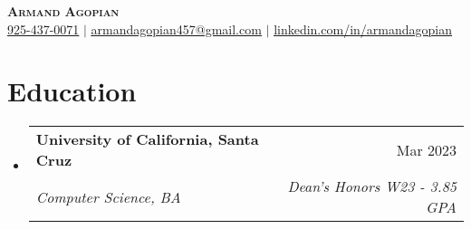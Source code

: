 \documentclass[letterpaper,11pt]{article}
\makeatletter
\newcommand{\resumeSubheading}[4]{
  \vspace{-2pt}\item
    \begin{tabular*}{0.97\textwidth}[t]{l@{\extracolsep{\fill}}r}
      \textbf{#1} & #2 \\
      \textit{\small#3} & \textit{\small #4} \\
    \end{tabular*}\vspace{-7pt}
}
\newcommand{\resumeSubHeadingListStart}{\begin{itemize}[leftmargin=0.15in, label={}]}
\newcommand{\resumeSubHeadingListEnd}{\end{itemize}}
\makeatother
\begin{document}

\begin{center}
    \textbf{\Huge \scshape Armand Agopian} \\ \vspace{1pt}
    \small \href{tel:+19254370071}{925-437-0071} $|$ 
    \href{mailto:armandagopian457@gmail.com}{\underline{armandagopian457@gmail.com}} $|$ 
    \href{https://linkedin.com/in/armandagopian}{\underline{linkedin.com/in/armandagopian}}
\end{center}

\vspace{-0.8cm}
\section{Education}
  \resumeSubHeadingListStart
    \resumeSubheading
      {University of California, Santa Cruz}{Mar 2023}
      {Computer Science, BA}{Dean's Honors W23 - 3.85 GPA}
  \resumeSubHeadingListEnd

\end{document}
